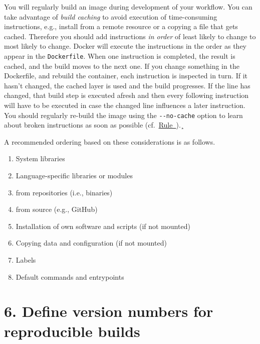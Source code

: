 \documentclass[10pt,letterpaper]{article}
\providecommand{\tightlist}{%
  \setlength{\itemsep}{0pt}\setlength{\parskip}{0pt}}
\begin{document}
You will regularly build an image during development of your workflow.
You can take advantage of \emph{build caching} to avoid execution of
time-consuming instructions, e.g., install from a remote resource or a
copying a file that gets cached. Therefore you should add instructions
\emph{in order} of least likely to change to most likely to change.
Docker will execute the instructions in the order as they appear in the
\texttt{Dockerfile}. When one instruction is completed, the result is
cached, and the build moves to the next one. If you change something in
the Dockerfile, and rebuild the container, each instruction is inspected
in turn. If it hasn't changed, the cached layer is used and the build
progresses. If the line has changed, that build step is executed afresh
and then every following instruction will have to be executed in case
the changed line influences a later instruction. You should regularly
re-build the image using the \texttt{-\/-no-cache} option to learn about
broken instructions as soon as possible
(cf.~\hyperref[{rule:usage}]{Rule~}).¸

A recommended ordering based on these considerations is as follows.

\begin{enumerate}
\def\labelenumi{\arabic{enumi}.}
\tightlist
\item
  System libraries
\item
  Language-specific libraries or modules
\item
  from repositories (i.e., binaries)
\item
  from source (e.g., GitHub)
\item
  Installation of own software and scripts (if not mounted)
\item
  Copying data and configuration (if not mounted)
\item
  Labels
\item
  Default commands and entrypoints
\end{enumerate}

\hypertarget{define-version-numbers-for-reproducible-builds}{%
\section*{6. Define version numbers for reproducible
builds}\label{define-version-numbers-for-reproducible-builds}}

  \label{rule:pinning} 
\end{document}
